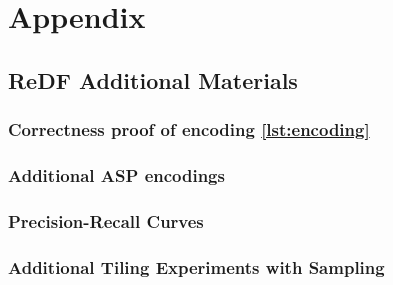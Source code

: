 \chapter{Appendix}\label{ch:redf_appendix}
\newcommand{\redfappenxid}{chapters/myappendix/tex}

\section{ReDF Additional Materials}
\subsection{Correctness proof of encoding \ref{lst:encoding}}
\label{proof:tiling}

\subsection{Additional ASP encodings}
\label{ASP_appendix}

\subsection{Precision-Recall Curves}\label{appendix:precision_recall}

\subsection{Additional Tiling Experiments with Sampling}\label{appendix:extra_experiment_with_alpha}



\cleardoublepage

